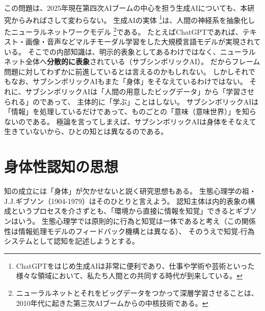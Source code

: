 この問題は、2025年現在第四次AIブームの中心を担う生成AIについても、本研究からみればさして変わらない。
生成AIの実体
\footnote{ChatGPTをはじめ生成AIは非常に便利であり、仕事や学術や芸術といった様々な領域において、私たち人間との共同する時代が到来している。
}は、人間の神経系を抽象化したニューラルネットワークモデル
\footnote{ニューラルネットとそれをビッグデータをつかって深層学習させることは、2010年代に起きた第三次AIブームからの中核技術である。
}である。
たとえばChatGPTであれば、テキスト・画像・音声などマルチモーダル学習をした大規模言語モデルが実現されている。
そこでの内部知識は、明示的表象としてあるわけではなく、ニューラルネット全体へ\textbf{分散的に表象}されている（サブシンボリックAI）。
だからフレーム問題に対してわずかに前進しているとは言えるのかもしれない。
しかしそれでもなお、サブシンボリックAIもまた「身体」をそなえているわけではない。
それに、サブシンボリックAIは「人間の用意したビッグデータ」から「学習させられる」のであって、
主体的に「学ぶ」\cite{saeki:1995}ことはしない。
サブシンボリックAIは「情報」を処理しているだけであって、ものごとの「意味（意味世界）」を知らないのである。
極論を言ってしまえば、サブシンボリックAIは身体をそなえて生きていないから、ひとの知とは異なるのである。

\section{身体性認知の思想}
\label{sec:shintaisei}

知の成立には「身体」が欠かせないと説く研究思想もある。
生態心理学の祖・J.J.ギブソン（1904-1979）\cite{gibson:1979}はそのひとりと言えよう。
認知主体は内的表象の構成というプロセスを介さずとも、「環境から直接に情報を知覚」できるとギブソンはいう。
生態心理学では原則的に行為と知覚は一体であると考え（この関係性は情報処理モデルのフィードバック機構とは異なる）、
そのうえで知覚-行為システムとして認知を記述しようとする。

